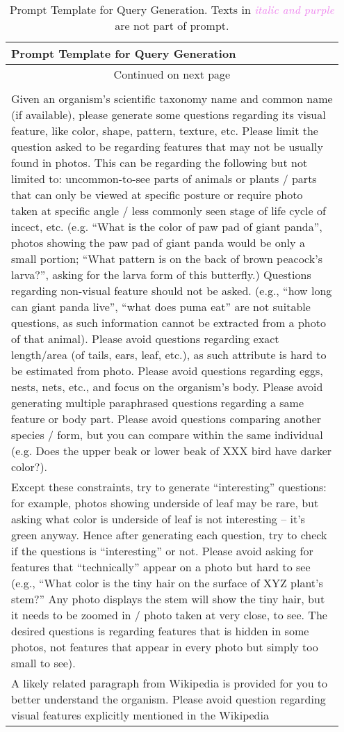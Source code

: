 \onecolumn
\begin{longtable}{p{0.95\linewidth}}
\label{tab:prompt_qgen}\\

\toprule[2pt]
\textbf{Prompt Template for Query Generation}\\ \midrule
\endfirsthead

\midrule
\endhead

\hline \multicolumn{1}{c}{{Continued on next page}} \\ \hline
\endfoot

\bottomrule\\[-0.8em]
\caption{Prompt Template for Query Generation. Texts in \textit{\textcolor{violet}{italic and purple}} are not part of prompt.}
\endlastfoot


Given an organism's scientific taxonomy name and common name (if available), please generate some questions regarding its visual feature, like color, shape, pattern, texture, etc. Please limit the question asked to be regarding features that may not be usually found in photos. This can be regarding the following but not limited to: uncommon-to-see parts of animals or plants / parts that can only be viewed at specific posture or require photo taken at specific angle / less commonly seen stage of life cycle of incect, etc. (e.g. ``What is the color of paw pad of giant panda'', photos showing the paw pad of giant panda would be only a small portion; ``What pattern is on the back of brown peacock's larva?'', asking for the larva form of this butterfly.) Questions regarding non-visual feature should not be asked. (e.g., ``how long can giant panda live'', ``what does puma eat'' are not suitable questions, as such information cannot be extracted from a photo of that animal). Please avoid questions regarding exact length/area (of tails, ears, leaf, etc.), as such attribute is hard to be estimated from photo. Please avoid questions regarding eggs, nests, nets, etc., and focus on the organism's body. Please avoid generating multiple paraphrased questions regarding a same feature or body part. Please avoid questions comparing another species / form, but you can compare within the same individual (e.g. Does the upper beak or lower beak of XXX bird have darker color?).\\Except these constraints, try to generate ``interesting'' questions: for example, photos showing underside of leaf may be rare, but asking what color is underside of leaf is not interesting -- it's green anyway. Hence after generating each question, try to check if the questions is ``interesting'' or not. Please avoid asking for features that ``technically'' appear on a photo but hard to see (e.g., ``What color is the tiny hair on the surface of XYZ plant's stem?'' Any photo displays the stem will show the tiny hair, but it needs to be zoomed in / photo taken at very close, to see. The desired questions is regarding features that is hidden in some photos, not features that appear in every photo but simply too small to see).\\A likely related paragraph from Wikipedia is provided for you to better understand the organism. Please avoid question regarding visual features explicitly mentioned in the Wikipedia 
\end{longtable}
